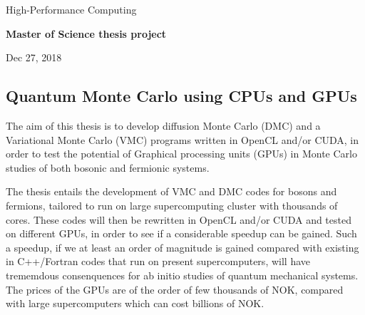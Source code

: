\documentclass[%
oneside,                 %
final,                   %
10pt]{article}
\begin{document}

\newcommand{\exercisesection}[1]{\subsection*{#1}}






\thispagestyle{empty}

\begin{center}
{\LARGE\bf
\begin{spacing}{1.25}
High-Performance Computing 
\end{spacing}
}
\end{center}


\begin{center}
{\bf Master of Science thesis project${}^{}$} \\ [0mm]
\end{center}

\begin{center}
\end{center}
    

\begin{center}
Dec 27, 2018
\end{center}

\vspace{1cm}


\subsection{Quantum Monte Carlo using CPUs and GPUs}

The aim of this thesis is to develop  diffusion Monte Carlo (DMC) and a Variational
Monte Carlo (VMC) programs written in OpenCL and/or CUDA, in order to test the potential
of Graphical processing units (GPUs) in Monte Carlo studies of both bosonic and fermionic systems.

The thesis entails the development of  VMC and DMC codes for bosons and fermions,
tailored to run on large supercomputing cluster with thousands of cores.
These codes will then be rewritten in OpenCL and/or CUDA and tested on different GPUs,
in order to see if a considerable speedup can be gained.
Such a speedup, if we at least an order of magnitude is gained compared 
with existing in C++/Fortran codes that run on present  supercomputers, will have trememdous consenquences for ab initio studies of quantum mechanical systems.  The prices of the GPUs are of the order of few thousands of NOK, compared
with large supercomputers which can cost billions of NOK. 
\end{document}
